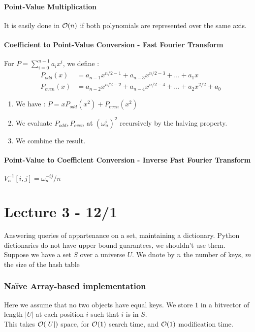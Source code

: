 \documentclass{cours}
\begin{document}
\subsection{Point-Value Multiplication}
It is easily done in $\mathcal{O}(n)$ if both polynomials are represented over the same axis.

\subsection{Coefficient to Point-Value Conversion - Fast Fourier Transform}
For $P = \sum_{i = 0}^{n-1} a_{i}x^{i}$, we define : \[
    \begin{aligned}
         & P_{odd}(x)  & = a_{n-1}x^{n/2-1} + a_{n-3}x^{n/2-3} + \ldots + a_{1}x              \\
         & P_{even}(x) & = a_{n-2}x^{n/2-2} + a_{n-4}x^{n/2-4} + \ldots+ a_{2}x^{2/2} + a_{0}
    \end{aligned}
\]
\begin{enumerate}
    \item We have : $P = xP_{odd}(x^{2}) + P_{even}(x^{2})$
    \item We evaluate $P_{odd}, P_{even}$ at $(\omega_{n}^{i})^{2}$ recursively by the halving property.
    \item We combine the result.
\end{enumerate}

\subsection{Point-Value to Coefficient Conversion - Inverse Fast Fourier Transform}
\begin{theorem}
    $V_{n}^{-1}[i, j] = \omega_{n}^{-ij}/n$
\end{theorem}

\part[Hashing]{Lecture 3 - 12/1}
\localtableofcontents

Answering queries of appartenance on a set, maintaining a dictionary. Python dictionaries do not have upper bound guarantees, we shouldn't use them. \\
Suppose we have a set $S$ over a universe $U$. We dnote by $n$ the number of keys, $m$ the size of the hash table

\section{Naïve Array-based implementation}
Here we assume that no two objects have equal keys. We store $1$ in a bitvector of length $|U|$ at each position $i$ such that $i$ is in $S$.\\
This takes $\mathcal{O}(|U|)$ space, for $\mathcal{O}(1)$ search time, and $\mathcal{O}(1)$ modification time.
\end{document}
